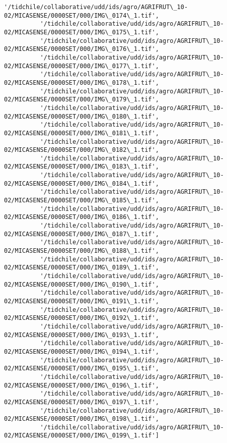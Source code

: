 \documentclass[11pt]{article}
\begin{document}
\begin{Verbatim}[commandchars=\\\{\}]
          '/tidchile/collaborative/udd/ids/agro/AGRIFRUT\_10-02/MICASENSE/0000SET/000/IMG\_0174\_1.tif',
          '/tidchile/collaborative/udd/ids/agro/AGRIFRUT\_10-02/MICASENSE/0000SET/000/IMG\_0175\_1.tif',
          '/tidchile/collaborative/udd/ids/agro/AGRIFRUT\_10-02/MICASENSE/0000SET/000/IMG\_0176\_1.tif',
          '/tidchile/collaborative/udd/ids/agro/AGRIFRUT\_10-02/MICASENSE/0000SET/000/IMG\_0177\_1.tif',
          '/tidchile/collaborative/udd/ids/agro/AGRIFRUT\_10-02/MICASENSE/0000SET/000/IMG\_0178\_1.tif',
          '/tidchile/collaborative/udd/ids/agro/AGRIFRUT\_10-02/MICASENSE/0000SET/000/IMG\_0179\_1.tif',
          '/tidchile/collaborative/udd/ids/agro/AGRIFRUT\_10-02/MICASENSE/0000SET/000/IMG\_0180\_1.tif',
          '/tidchile/collaborative/udd/ids/agro/AGRIFRUT\_10-02/MICASENSE/0000SET/000/IMG\_0181\_1.tif',
          '/tidchile/collaborative/udd/ids/agro/AGRIFRUT\_10-02/MICASENSE/0000SET/000/IMG\_0182\_1.tif',
          '/tidchile/collaborative/udd/ids/agro/AGRIFRUT\_10-02/MICASENSE/0000SET/000/IMG\_0183\_1.tif',
          '/tidchile/collaborative/udd/ids/agro/AGRIFRUT\_10-02/MICASENSE/0000SET/000/IMG\_0184\_1.tif',
          '/tidchile/collaborative/udd/ids/agro/AGRIFRUT\_10-02/MICASENSE/0000SET/000/IMG\_0185\_1.tif',
          '/tidchile/collaborative/udd/ids/agro/AGRIFRUT\_10-02/MICASENSE/0000SET/000/IMG\_0186\_1.tif',
          '/tidchile/collaborative/udd/ids/agro/AGRIFRUT\_10-02/MICASENSE/0000SET/000/IMG\_0187\_1.tif',
          '/tidchile/collaborative/udd/ids/agro/AGRIFRUT\_10-02/MICASENSE/0000SET/000/IMG\_0188\_1.tif',
          '/tidchile/collaborative/udd/ids/agro/AGRIFRUT\_10-02/MICASENSE/0000SET/000/IMG\_0189\_1.tif',
          '/tidchile/collaborative/udd/ids/agro/AGRIFRUT\_10-02/MICASENSE/0000SET/000/IMG\_0190\_1.tif',
          '/tidchile/collaborative/udd/ids/agro/AGRIFRUT\_10-02/MICASENSE/0000SET/000/IMG\_0191\_1.tif',
          '/tidchile/collaborative/udd/ids/agro/AGRIFRUT\_10-02/MICASENSE/0000SET/000/IMG\_0192\_1.tif',
          '/tidchile/collaborative/udd/ids/agro/AGRIFRUT\_10-02/MICASENSE/0000SET/000/IMG\_0193\_1.tif',
          '/tidchile/collaborative/udd/ids/agro/AGRIFRUT\_10-02/MICASENSE/0000SET/000/IMG\_0194\_1.tif',
          '/tidchile/collaborative/udd/ids/agro/AGRIFRUT\_10-02/MICASENSE/0000SET/000/IMG\_0195\_1.tif',
          '/tidchile/collaborative/udd/ids/agro/AGRIFRUT\_10-02/MICASENSE/0000SET/000/IMG\_0196\_1.tif',
          '/tidchile/collaborative/udd/ids/agro/AGRIFRUT\_10-02/MICASENSE/0000SET/000/IMG\_0197\_1.tif',
          '/tidchile/collaborative/udd/ids/agro/AGRIFRUT\_10-02/MICASENSE/0000SET/000/IMG\_0198\_1.tif',
          '/tidchile/collaborative/udd/ids/agro/AGRIFRUT\_10-02/MICASENSE/0000SET/000/IMG\_0199\_1.tif']
\end{Verbatim}
            
\end{document}
